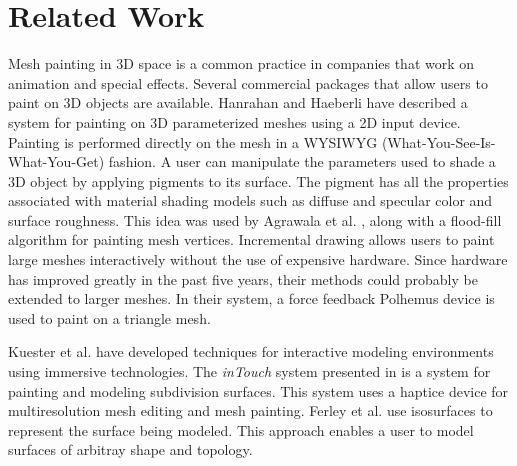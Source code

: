 \documentclass[10pt,twocolumn]{article}
\begin{document}
\section{Related Work}
\indent Mesh painting in 3D space is a common practice in companies 
that work on animation and special effects. 
Several commercial packages that allow users to paint on 3D objects are available.
Hanrahan and Haeberli \cite{hanrahan90c} have described a system for painting on 3D 
parameterized meshes using a 2D input device. 
Painting is performed directly on the 
mesh in a WYSIWYG (What-You-See-Is-What-You-Get) fashion.
A user can manipulate the parameters used to
shade a 3D object by applying pigments to its surface. 
The pigment has all the properties associated with
material shading models such as diffuse and specular color and surface roughness. 
This idea was used by Agrawala et al. \cite{Agrawala:1995:PSS}, 
along with a flood-fill algorithm for painting mesh vertices. 
Incremental drawing allows users to paint 
large meshes interactively without the use of expensive hardware. 
Since hardware has improved greatly in the past five years,
their methods could probably be extended to larger meshes. 
In their system, a force feedback Polhemus device is used to paint on a triangle mesh.


Kuester et al. \cite{Kuester:2000:SPIE} 
have developed techniques for interactive modeling environments using immersive technologies.
The {\em inTouch} system presented in \cite{VR00*45} is a system  for painting and modeling
subdivision surfaces.
This system uses a haptice device for multiresolution mesh editing and mesh painting. 
Ferley et al. \cite{FCG99b} use isosurfaces to represent the surface being modeled.
This approach enables a user to model surfaces of arbitray shape and topology.
\end{document}
